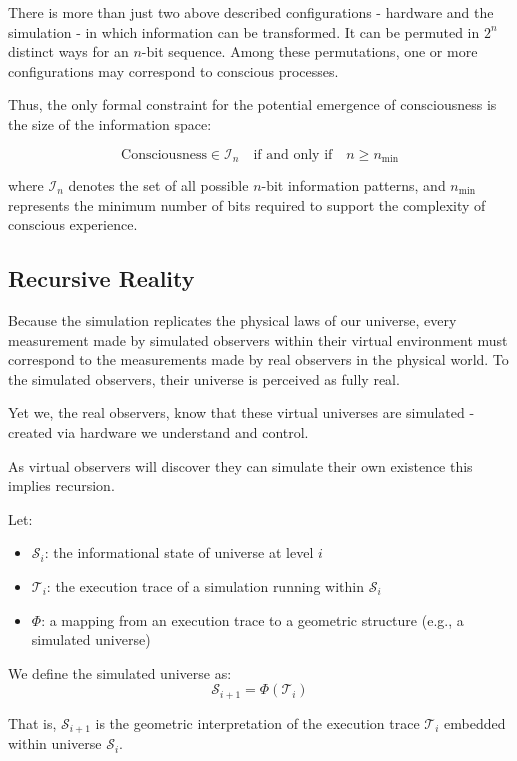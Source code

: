 \documentclass[11pt]{article}
\begin{document}
There is more than just two above described configurations - hardware and the simulation - in which information can be transformed. It can be permuted in $2^n$ distinct ways for an $n$-bit sequence. Among these permutations, one or more configurations may correspond to conscious processes.

Thus, the only formal constraint for the potential emergence of consciousness is the size of the information space:

\[
  \text{Consciousness} \in \mathcal{I}_n \quad \text{if and only if} \quad n \geq n_{\text{min}}
\]

where $\mathcal{I}_n$ denotes the set of all possible $n$-bit information patterns, and $n_{\text{min}}$ represents the minimum number of bits required to support the complexity of conscious experience.



\subsection{Recursive Reality}

Because the simulation replicates the physical laws of our universe, every measurement made by simulated observers within their virtual environment must correspond to the measurements made by real observers in the physical world. To the simulated observers, their universe is perceived as fully real.

Yet we, the real observers, know that these virtual universes are simulated - created via hardware we understand and control.

As virtual observers will discover they can simulate their own existence \cite{bostrom2003} this implies recursion.

Let:

\begin{itemize}
  \item \( \mathcal{S}_i \): the informational state of universe at level \( i \)
  \item \( \mathcal{T}_i \): the execution trace of a simulation running within \( \mathcal{S}_i \)
  \item \( \Phi \): a mapping from an execution trace to a geometric structure (e.g., a simulated universe)
\end{itemize}

We define the simulated universe as:
\[
  \mathcal{S}_{i+1} = \Phi(\mathcal{T}_i)
\]

That is, \( \mathcal{S}_{i+1} \) is the geometric interpretation of the execution trace \( \mathcal{T}_i \) embedded within universe \( \mathcal{S}_i \).
\end{document}

